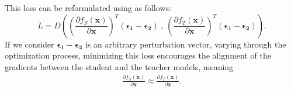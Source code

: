 \documentclass{article} %
\begin{document}
This loss can be reformulated using  as follows:
\begin{equation}
\label{method-4} L = D\left (\left ( \frac{\partial f_S(\textbf{x})}{\partial \textbf{x}}\right )^T (\boldsymbol{\epsilon_1} - \boldsymbol{\epsilon_2}) \ , \ \left ( \frac{\partial f_T(\textbf{x})}{\partial \textbf{x}}\right )^T (\boldsymbol{\epsilon_1} - \boldsymbol{\epsilon_2}) \right ). 
\end{equation} 
If we consider $\boldsymbol{\epsilon_1} - \boldsymbol{\epsilon_2}$ is an arbitrary perturbation vector, varying through the optimization process,  minimizing this loss encourages the alignment of the gradients between the student and the teacher models, meaning \begin{equation}\label{method-5}
\begin{split} \frac{\partial f_S(\textbf{x})}{\partial \textbf{x}} \approx \frac{\partial f_T(\textbf{x})}{\partial \textbf{x}}. 
\end{split} 
\end{equation} 


 
\end{document}
